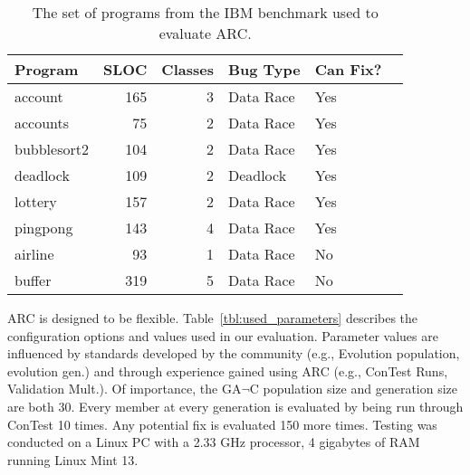 \documentclass[runningheads,a4paper]{llncs}
\begin{document}
\begin{table}[h]
\caption{The set of programs from the IBM benchmark used to evaluate ARC.}
\begin{center}
\begin{tabular}{|l|r|r|l|l|p{4.5cm}|}
\hline
\textbf{Program} & \textbf{SLOC} & \textbf{Classes} & \textbf{Bug Type} & \textbf{Can Fix?}\\
\hline
account & 165 & 3 & Data Race & Yes\\
\hline
accounts & 75 & 2 & Data Race & Yes\\
\hline
bubblesort2 & 104 & 2 & Data Race & Yes\\
\hline

deadlock & 109 & 2 & Deadlock & Yes\\
\hline
lottery & 157 & 2 & Data Race & Yes\\
\hline
pingpong & 143 & 4 & Data Race & Yes\\
\hline
airline & 93 & 1 & Data Race & No\\
\hline
buffer & 319 & 5 & Data Race & No\\
\hline
\end{tabular}
\label{tbl:used_programs}
\end{center}
\end{table}

ARC is designed to be flexible. Table~\ref{tbl:used_parameters} describes the configuration options and values used in our evaluation. Parameter values are influenced by standards developed by the community (e.g., Evolution population, evolution gen.) and through experience gained using ARC (e.g., ConTest Runs, Validation Mult.). Of importance, the GA$\neg$C population size and generation size are both 30.  Every member at every generation is evaluated by being run through ConTest 10 times.  Any potential fix is evaluated 150 more times. Testing was conducted on a Linux PC with a 2.33 GHz processor, 4 gigabytes of RAM running Linux Mint 13.
\end{document}
